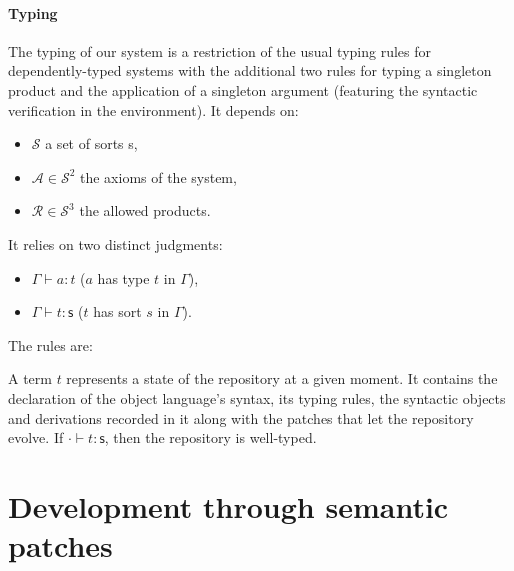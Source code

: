 \documentclass{article}
\newcommand{\sort}{\textsf{s}}
\newcommand{\subst}[2]{\{#1/#2\}}
\begin{document}
\paragraph{Typing} The typing of our system is a restriction of the
usual typing rules for dependently-typed systems with the additional
two rules for typing a singleton product and the application of a
singleton argument (featuring the syntactic verification in the
environment). It depends on: 
\begin{itemize}
  \item$\mathcal S$ a set of sorts \sort,
  \item$\mathcal A \in \mathcal S^2$ the axioms of the system,
  \item$\mathcal R \in \mathcal S^3$ the allowed products.
\end{itemize}
It relies on two distinct judgments:
\begin{itemize}
\item $\Gamma\vdash a : t$ ($a$ has type $t$ in $\Gamma$),
\item $\Gamma\vdash t : \sort$ ($t$ has sort $s$ in $\Gamma$).
\end{itemize}
The rules are:

A term $t$ represents a state of the repository at a given moment. It
contains the declaration of the object language's syntax, its typing
rules, the syntactic objects and derivations recorded in it along with
the patches that let the repository evolve. If $\cdot\vdash t:\sort$,
then the repository is well-typed.

\section{Development through semantic patches}
\end{document}
